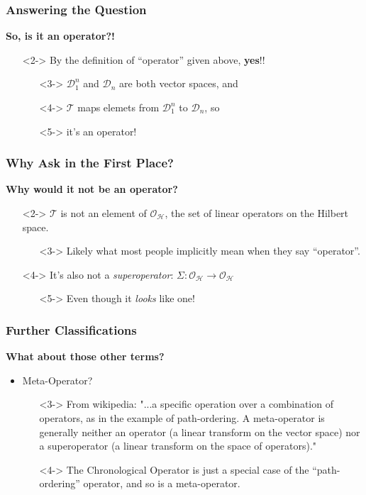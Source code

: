 \documentclass{beamer}
\begin{document}
\begin{frame}
    \frametitle{Answering the Question}
    \alert{\textbf{So, is it an operator?!}}
    \begin{itemize}
        \item[\textbullet]<2-> By the definition of ``operator'' given above, \textbf{yes}!!
        \begin{itemize}
            \item[\textbullet]<3-> $\mathcal{D}_1^n$ and $\mathcal{D}_n$ are both vector spaces, and
            \item[\textbullet]<4-> $\mathscr{T}$ maps elemets from $\mathcal{D}_1^n$ to $\mathcal{D}_n$, so 
            \item[\textbullet]<5-> it's an operator!
        \end{itemize}
    \end{itemize}
\end{frame}

\begin{frame}
\frametitle{Why Ask in the First Place?}
\alert{\textbf{Why would it not be an operator?}}
\begin{itemize}
    \item[\textbullet]<2-> $\mathscr{T}$ is not an element of $\mathcal{O}_{\mathcal{H}}$, the set of linear operators on the Hilbert space.
    \begin{itemize}
        \item[\textbullet]<3-> Likely what most people implicitly mean when they say ``operator''.
    \end{itemize}
    \item[\textbullet]<4-> It's also not a \textit{superoperator}: $\Sigma: \mathcal{O}_{\mathcal{H}} \to \mathcal{O}_{\mathcal{H}}$ 
    \begin{itemize}
        \item[\textbullet]<5-> Even though it \textit{looks} like one!
    \end{itemize}
\end{itemize}
\end{frame}

\begin{frame}
\frametitle{Further Classifications}
\alert{\textbf{What about those other terms?}}
\begin{itemize}
    \item<2-> Meta-Operator?
    \begin{itemize}
        \item[\textbullet]<3-> From wikipedia: "...a specific operation over a combination of operators, as in the example of path-ordering. A meta-operator is generally neither an operator (a linear transform on the vector space) nor a superoperator (a linear transform on the space of operators)."
        \item[\textbullet]<4-> The Chronological Operator is just a special case of the ``path-ordering'' operator, and so is a meta-operator. 
    \end{itemize}
\end{itemize}
\end{frame}
\end{document}
